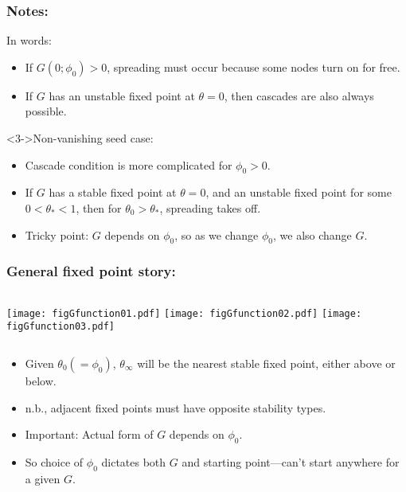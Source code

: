 \begin{frame}
  \frametitle{Notes:}

  \begin{block}{In words:}    
    \begin{itemize}
    \item<1-> 
      If $G(0;\phi_0) > 0$, spreading must occur because
      some nodes turn on for free.
    \item<2-> 
      If $G$ has an \alert{unstable fixed point} at $\theta = 0$,
      then cascades are also always possible.
    \end{itemize}
  \end{block}

  \begin{block}<3->{Non-vanishing seed case:}
    \begin{itemize}
    \item<3-> 
      Cascade condition is more complicated for
      $\phi_0 > 0$.
    \item<4-> 
      If $G$ has a \alert{stable fixed point} at $\theta = 0$,
      and an \alert{unstable fixed point} for some $0 < \theta_\ast < 1$,
      then for $\theta_0  > \theta_\ast$, spreading takes off.
    \item<5->
      Tricky point: $G$ depends on $\phi_0$, so as we change
      $\phi_0$, we also change $G$.
    \end{itemize}
  \end{block}

\end{frame}

\begin{frame}
  \frametitle{General fixed point story:}

  \begin{columns}
    \texttt{[image: figGfunction01.pdf]}
    \texttt{[image: figGfunction02.pdf]}
    \texttt{[image: figGfunction03.pdf]}
  \end{columns}

  \begin{itemize}
  \item<1-> 
    Given $\theta_0 (= \phi_0)$, $\theta_\infty$ will be 
    the nearest stable fixed point, either above or below.
  \item<2-> 
    n.b., adjacent fixed points must have opposite stability types.
  \item<3-> 
    \alert{Important:}
    Actual form of $G$ depends on $\phi_0$.  
  \item<4->
    So choice of $\phi_0$ dictates both $G$ and starting
    point---can't start anywhere for a given $G$.
  \end{itemize}

\end{frame}

